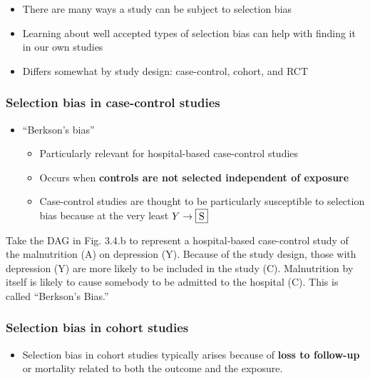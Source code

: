 \documentclass[
]{book}
\providecommand{\tightlist}{%
  \setlength{\itemsep}{0pt}\setlength{\parskip}{0pt}}
\begin{document}
\begin{itemize}
\tightlist
\item
  There are many ways a study can be subject to selection bias
\item
  Learning about well accepted types of selection bias can help with finding it in our own studies
\item
  Differs somewhat by study design: case-control, cohort, and RCT
\end{itemize}

\hypertarget{selection-bias-in-case-control-studies}{%
\subsubsection{Selection bias in case-control studies}\label{selection-bias-in-case-control-studies}}

\begin{itemize}
\tightlist
\item
  ``Berkson's bias''

  \begin{itemize}
  \tightlist
  \item
    Particularly relevant for hospital-based case-control studies
  \item
    Occurs when \textbf{controls are not selected independent of exposure}
  \item
    Case-control studies are thought to be particularly susceptible to selection bias because at the very least \(Y \rightarrow \fbox{S}\)
  \end{itemize}
\end{itemize}

Take the DAG in Fig. 3.4.b to represent a hospital-based case-control study of the malnutrition (A) on depression (Y). Because of the study design, those with depression (Y) are more likely to be included in the study (C). Malnutrition by itself is likely to cause somebody to be admitted to the hospital (C). This is called ``Berkson's Bias.''

\hypertarget{selection-bias-in-cohort-studies}{%
\subsubsection{Selection bias in cohort studies}\label{selection-bias-in-cohort-studies}}

\begin{itemize}
\tightlist
\item
  Selection bias in cohort studies typically arises because of \textbf{loss to follow-up} or mortality related to both the outcome and the exposure.
\end{itemize}
\end{document}
